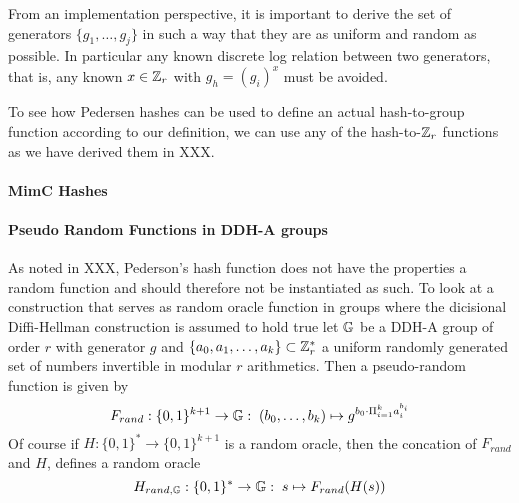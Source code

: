 From an implementation perspective, it is important to derive the set of generators $\{g_1,\ldots,g_j\}$ in such a way that they are as uniform and random as possible. In particular any known discrete log relation between two generators, that is, any known $x\in \mathbb{Z}_r$ with $g_h = (g_i)^x$ must be avoided.

To see how Pedersen hashes can be used to define an actual hash-to-group function according to our definition, we can use any of the hash-to-$\mathbb{Z}_r$ functions as we have derived them in XXX. 

\paragraph{MimC Hashes}
\paragraph{Pseudo Random Functions in DDH-A groups}
As noted in XXX, Pederson's hash function does not have the properties a random function and should therefore not be instantiated as such. To look at a construction that serves as random oracle function in groups where the dicisional Diffi-Hellman construction is assumed to hold true let $\mathbb{G}$ be a DDH-A group of order $r$ with generator $g$ and $\{a_0,a_1,\ldots,a_k\}\subset \mathbb{Z}_{r}^*$ a uniform randomly generated set of numbers invertible in modular $r$ arithmetics. Then a pseudo-random function is given by
\begin{equation}
F_{rand}: \{0,1\}^{k+1} \to \mathbb{G}:\; (b_0,\ldots,b_k)\mapsto g^{b_0\cdot \Pi_{i=1}^k a_i^{b_i}}
\end{equation}
Of course if $H:\{0,1\}^*\to \{0,1\}^{k+1}$ is a random oracle, then the concation of $F_{rand}$ and $H$, defines a random oracle 
\begin{equation}
H_{rand,\mathbb{G}}:\{0,1\}^* \to \mathbb{G}:\; s\mapsto F_{rand}(H(s))
\end{equation}

